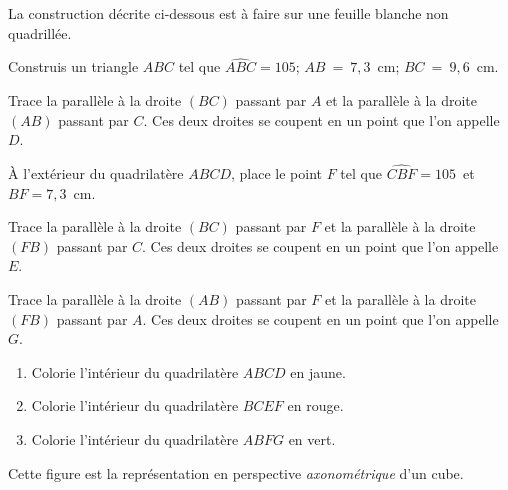 La construction décrite ci-dessous est à faire sur une feuille blanche
non quadrillée.
\begin{myenumerate}
\item Construis un triangle $ABC$ tel que $\widehat{ABC}=105$\degres;
$AB~=~7,3$~cm; $BC~=~9,6$~cm.
\item Trace la parallèle à la droite $(BC)$ passant par $A$ et la
parallèle à la droite $(AB)$ passant par $C$. Ces deux droites se
coupent en un point que l'on appelle $D$.
\item \`A l'extérieur du quadrilatère $ABCD$, place le point $F$ tel
que $\widehat{CBF}=105$\degres\ et $BF=7,3$~cm.
\item Trace la parallèle à la droite $(BC)$ passant par $F$ et la
parallèle à la droite $(FB)$ passant par $C$. Ces deux droites se
coupent en un point que l'on appelle $E$.
\item Trace la parallèle à la droite $(AB)$ passant par $F$ et la
parallèle à la droite $(FB)$ passant par $A$. Ces deux droites se
coupent en un point que l'on appelle $G$.
\item
  \begin{enumerate}
  \item Colorie l'intérieur du quadrilatère $ABCD$ en jaune.
  \item Colorie l'intérieur du quadrilatère $BCEF$ en rouge.
  \item Colorie l'intérieur du quadrilatère $ABFG$ en vert.
  \end{enumerate}
\end{myenumerate} Cette figure est la représentation en perspective
\emph{axonométrique} d'un cube.